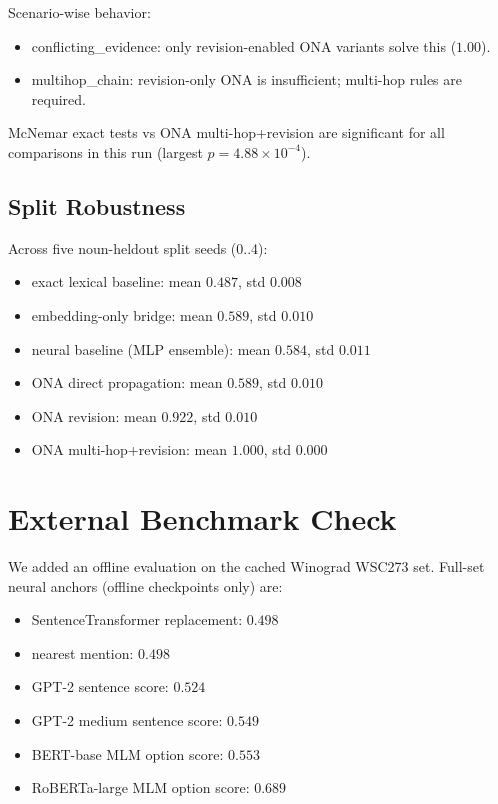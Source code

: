 \documentclass{article}
\begin{document}
Scenario-wise behavior:
\begin{itemize}
    \item conflicting\_evidence: only revision-enabled ONA variants solve this (\(1.00\)).
    \item multihop\_chain: revision-only ONA is insufficient; multi-hop rules are required.
\end{itemize}

McNemar exact tests vs ONA multi-hop+revision are significant for all comparisons in this run (largest \(p=4.88\times10^{-4}\)).

\subsection{Split Robustness}
Across five noun-heldout split seeds (0..4):
\begin{itemize}
    \item exact lexical baseline: mean \(0.487\), std \(0.008\)
    \item embedding-only bridge: mean \(0.589\), std \(0.010\)
    \item neural baseline (MLP ensemble): mean \(0.584\), std \(0.011\)
    \item ONA direct propagation: mean \(0.589\), std \(0.010\)
    \item ONA revision: mean \(0.922\), std \(0.010\)
    \item ONA multi-hop+revision: mean \(1.000\), std \(0.000\)
\end{itemize}

\section{External Benchmark Check}
We added an offline evaluation on the cached Winograd WSC273 set. Full-set neural anchors (offline checkpoints only) are:
\begin{itemize}
    \item SentenceTransformer replacement: \(0.498\)
    \item nearest mention: \(0.498\)
    \item GPT-2 sentence score: \(0.524\)
    \item GPT-2 medium sentence score: \(0.549\)
    \item BERT-base MLM option score: \(0.553\)
    \item RoBERTa-large MLM option score: \(0.689\)
\end{itemize}
\end{document}
